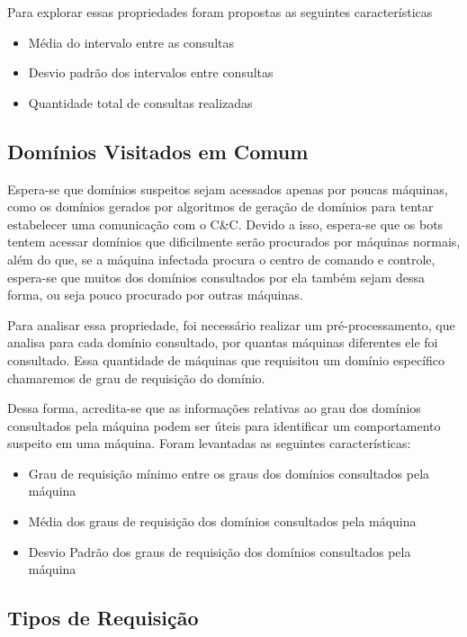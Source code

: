 Para explorar essas propriedades foram propostas as seguintes características 

\begin{itemize}
\item Média do intervalo entre as consultas
\item Desvio padrão dos intervalos entre consultas
\item Quantidade total de consultas realizadas
\end{itemize}

\subsection{Domínios Visitados em Comum}
Espera-se que domínios suspeitos sejam acessados apenas por poucas máquinas, como os domínios gerados por algoritmos de geração de domínios para tentar estabelecer uma comunicação com o C\&C. Devido a isso, espera-se que os bots tentem acessar domínios que dificilmente serão procurados por máquinas normais, além do que, se a máquina infectada procura o centro de comando e controle, espera-se que muitos dos domínios consultados por ela também sejam dessa forma, ou seja pouco procurado por outras máquinas.

Para analisar essa propriedade, foi necessário realizar um pré-processamento, que analisa para cada domínio consultado, por quantas máquinas diferentes ele foi consultado. Essa quantidade de máquinas que requisitou um domínio específico chamaremos de grau de requisição do domínio.

Dessa forma, acredita-se que as informações relativas ao grau dos domínios consultados pela máquina podem ser úteis para identificar um comportamento suspeito em uma máquina. Foram levantadas as seguintes características:

\begin{itemize}
\item Grau de requisição mínimo entre os graus dos domínios consultados pela máquina
\item Média dos graus de requisição dos domínios consultados pela máquina
\item Desvio Padrão dos graus de requisição dos domínios consultados pela máquina

\end{itemize}

\subsection{Tipos de Requisição}

